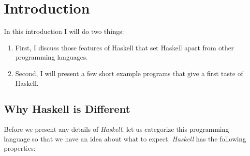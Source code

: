 \chapter{Introduction}
In this introduction I will do two things:
\begin{enumerate}
\item First, I discuss those features of Haskell that set Haskell apart from other programming languages.
\item Second, I will present a few short example programs that give a first taste of Haskell.
\end{enumerate}

\section{Why Haskell is Different}
Before we present any details of \textsl{Haskell}, let us categorize this programming language so that we have
an idea about what to expect.  \textsl{Haskell} has the following properties:
